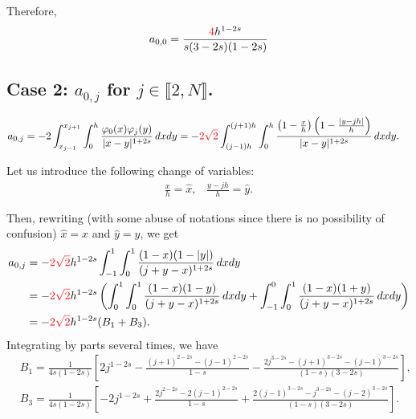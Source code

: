\documentclass[11 pt]{article}
\newcommand\inter[1]{\llbracket #1\rrbracket}
\numberwithin{equation}{section}
\newcommand{\B}[1]{{\color{red} #1}}  %
\begin{document}
Therefore,
%
\begin{equation*}
    a_{0,0}=\frac{\B{4}h^{1 - 2 s}}{s (3 - 2 s) (1 - 2 s)}
\end{equation*}
%

\subsection{Case 2: $a_{0,j}$ for $j\in\inter{2,N}$.}

\begin{align*}
	a_{0,j}&=-2 \int_{x_{j-1}}^{x_{j+1}}\int_{0}^{h}\frac{\varphi_0(x)\varphi_j(y)}{|x-y|^{1+2s}}\,dxdy
=-\B{2\sqrt{2}} \int_{(j-1)h}^{(j+1)h}\int_0^{h}\frac{\left(1-\frac{x}{h}\right)\left(1-\frac{|y-jh|}{h}\right)}{|x-y|^{1+2s}}\,dxdy.
\end{align*}

Let us introduce the following change of variables:
\begin{align*}
	\frac{x}{h}=\hat{x},\;\;\; \frac{y-jh}{h}=\hat{y}.
\end{align*}

Then, rewriting (with some abuse of notations since there is no possibility of confusion) $\hat{x}=x$ and $\hat{y}=y$, we get 
\begin{align}\label{elem_noint_cv}
	a_{0,j}&=-\B{2\sqrt{2}}h^{1-2s} \int_{-1}^1\int_{0}^1\frac{(1-x)(1-|y|)}{(j+y-x)^{1+2s}}\,dxdy\\
	&=-\B{2\sqrt{2}}h^{1-2s} \left(\int_{0}^1\int_{0}^1\frac{(1-x)(1-y)}{(j+y-x)^{1+2s}}\,dxdy
	+\int_{-1}^0\int_{0}^1\frac{(1-x)(1+y)}{(j+y-x)^{1+2s}}\,dxdy\right)\\
	&=-\B{2\sqrt{2}}h^{1-2s}(B_1+B_3).
\end{align}
Integrating by parts several times, we have
\begin{align*}
	& B_1 = \frac{1}{4s(1-2s)}\left[2j^{1-2s}-\frac{(j+1)^{2-2s}-(j-1)^{2-2s}}{1-s}-\frac{2j^{3-2s}-(j+1)^{3-2s}-(j-1)^{3-2s}}{(1-s)(3-2s)}\right],\\
	& B_3 = \frac{1}{4s(1-2s)}\left[-2j^{1-2s}+\frac{2j^{2-2s}-2(j-1)^{2-2s}}{1-s}+\frac{2(j-1)^{3-2s}-j^{3-2s}-(j-2)^{3-2s}}{(1-s)(3-2s)}\right].
\end{align*} 
\end{document}
